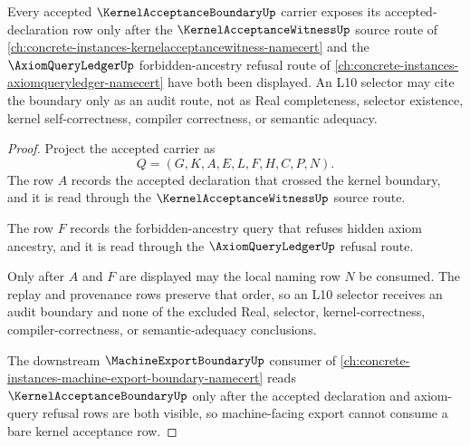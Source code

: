\begin{theorem}
\label{thm:kernelacceptanceboundary-sibling-route}
Every accepted $\KernelAcceptanceBoundaryUp$ carrier exposes its accepted-declaration row only after the $\KernelAcceptanceWitnessUp$ source route of \autoref{ch:concrete-instances-kernelacceptancewitness-namecert} and the $\AxiomQueryLedgerUp$ forbidden-ancestry refusal route of \autoref{ch:concrete-instances-axiomqueryledger-namecert} have both been displayed. An L10 selector may cite the boundary only as an audit route, not as Real completeness, selector existence, kernel self-correctness, compiler correctness, or semantic adequacy.
\end{theorem}
\begin{proof}
Project the accepted carrier as
$$
Q=(G,K,A,E,L,F,H,C,P,N).
$$
The row $A$ records the accepted declaration that crossed the kernel boundary, and it is read through the $\KernelAcceptanceWitnessUp$ source route.

The row $F$ records the forbidden-ancestry query that refuses hidden axiom ancestry, and it is read through the $\AxiomQueryLedgerUp$ refusal route.

Only after $A$ and $F$ are displayed may the local naming row $N$ be consumed. The replay and provenance rows preserve that order, so an L10 selector receives an audit boundary and none of the excluded Real, selector, kernel-correctness, compiler-correctness, or semantic-adequacy conclusions.

The downstream $\MachineExportBoundaryUp$ consumer of \autoref{ch:concrete-instances-machine-export-boundary-namecert} reads $\KernelAcceptanceBoundaryUp$ only after the accepted declaration and axiom-query refusal rows are both visible, so machine-facing export cannot consume a bare kernel acceptance row.
\end{proof}
